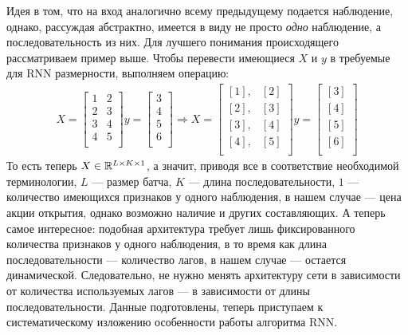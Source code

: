 Идея в том, что на вход аналогично всему предыдущему подается наблюдение, однако, рассуждая абстрактно, имеется в виду не просто \textit{одно} наблюдение, а последовательность из них. Для лучшего понимания происходящего рассматриваем пример выше. Чтобы перевести имеющиеся $X$ и $y$ в требуемые для RNN размерности, выполняем операцию:
\begin{equation}
	\begin{split}
		X = \left[\begin{matrix}
			1 & 2\\
			2 & 3\\
			3 & 4\\
			4 & 5\\
		\end{matrix}\right]
		y = \left[\begin{matrix}
			3\\
			4\\
			5\\
			6\\
		\end{matrix}\right]
		\Rightarrow
		X = \left[\begin{matrix}
			[1], & [2]\\
			[2], & [3]\\
			[3], & [4]\\
			[4], & [5]\\
		\end{matrix}\right]
		y = \left[\begin{matrix}
			[3]\\
			[4]\\
			[5]\\
			[6]\\
		\end{matrix}\right]
	\end{split}	
\end{equation}
То есть теперь $X \in \mathbb{R}^{L \times K \times 1}$, а значит, приводя все в соответствие необходимой терминологии, $L$ --- размер батча, $K$ --- длина последовательности, $1$ --- количество имеющихся признаков у одного наблюдения, в нашем случае --- цена акции открытия, однако возможно наличие и других составляющих. А теперь самое интересное: подобная архитектура требует лишь фиксированного количества признаков у одного наблюдения, в то время как длина последовательности --- количество лагов, в нашем случае --- остается динамической. Следовательно, не нужно менять архитектуру сети в зависимости от количества используемых лагов --- в зависимости от длины последовательности. Данные подготовлены, теперь приступаем к систематическому изложению особенности работы алгоритма RNN.

